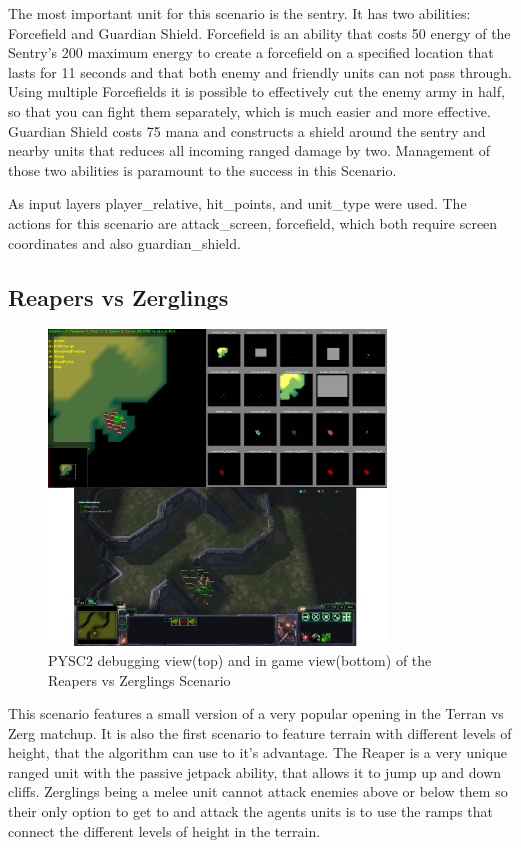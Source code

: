 The most important unit for this scenario is the sentry. It has two abilities: Forcefield and Guardian Shield. Forcefield is an ability that costs 50 energy of the Sentry's 200 maximum energy to create a forcefield on a specified location that lasts for 11 seconds and that both enemy and friendly units can not pass through. Using multiple Forcefields it is possible to effectively cut the enemy army in half, so that you can fight them separately, which is much easier and more effective. Guardian Shield costs 75 mana and constructs a shield around the sentry and nearby units that reduces all incoming ranged damage by two. Management of those two abilities is paramount to the success in this Scenario.

As input layers player\_relative, hit\_points, and unit\_type were used. The actions for this scenario are attack\_screen, forcefield, which both require screen coordinates and also guardian\_shield.


\subsection{Reapers vs Zerglings}
\begin{figure}[htb]
  \centering
      \includegraphics[width=0.8\textwidth]{Figures/Reapers_zergling.png}
  \caption{PYSC2 debugging view(top) and in game view(bottom) of the Reapers vs Zerglings Scenario }
\end{figure}
This scenario features a small version of a very popular opening in the Terran vs Zerg matchup.
It is also the first scenario to feature terrain with different levels of height, that the algorithm can use to it's advantage. The Reaper is a very unique ranged unit with the passive jetpack ability, that allows it to jump up and down cliffs. Zerglings being a melee unit cannot attack enemies above or below them so their only option to get to and attack the agents units is to use the ramps that connect the different levels of height in the terrain.

